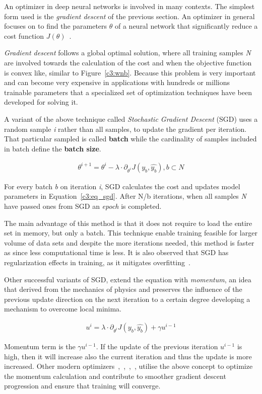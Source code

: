 An optimizer in deep neural networks is involved in many contexts. The simplest form used is the \textit{gradient descent} of the previous section.
An optimizer in general focuses on to find the parameters \textbf{$\theta$} of a neural network that significantly reduce a cost function $J(\theta)$~\cite{Goodfellow2016}.

\textit{Gradient descent} follows a global optimal solution, where all training samples \textit{N} are involved towards the calculation of the cost and when the objective function is convex like, similar to Figure~\ref{c3:wnb}.
Because this problem is very important and can become very expensive in applications with hundreds or millions trainable parameters that a specialized set of optimization techniques have been developed for solving it.

A variant of the above technique called \textit{Stochastic Gradient Descent} (SGD) uses a random sample \textit{i} rather than all samples, to update the gradient per iteration. That particular sampled is called \textbf{batch} while the cardinality of samples included in batch define the \textbf{batch size}.
\begin{ceqn}
\begin{align}
 \theta^{i+1} = \theta^i - \lambda \cdot \partial_{\theta^i} J(y_b,\hat{y_b}), b \subset N
\end{align}
\label{c3:eq_sgd}
\end{ceqn}
For every batch \textit{b} on iteration \textit{i}, SGD calculates the cost and updates model parameters in Equation~\ref{c3:eq_sgd}. After N/b iterations, when all samples \textit{N} have passed ones from SGD an \textit{epoch} is completed.

The main advantage of this method is that it does not require to load the entire set in memory, but only a batch. This technique enable training feasible for larger volume of data sets and despite the more iterations needed, this method is faster as since less computational time is less. It is also observed that SGD has regularization effects in training, as it mitigates overfitting~\cite{sun2019survey}.

Other successful variants of SGD, extend the equation with \textit{momentum}, an idea that derived from the mechanics of physics and preserves the influence of the previous update direction on the next iteration to a certain degree developing a mechanism to overcome local minima.
\begin{ceqn}
\begin{align}
 u^i = \lambda \cdot \partial_{\theta^i} J(y_b,\hat{y_b}) + \gamma u^{i-1}
\end{align}
\label{c3:eq_sgd_momentum}
\end{ceqn}
Momentum term is the $\gamma u^{i-1}$. If the update of the previous iteration  $u^{i-1}$ is high, then it will increase also the current iteration and thus the update is more increased. 
Other modern optimizers~\cite{kingma2014adam},~\cite{zeiler2012adadelta},~\cite{ duchi2011adaptive},~\cite{dozat2016incorporating}, utilise the above concept to optimize the momentum calculation and contribute to smoother gradient descent progression and ensure that training will converge.

